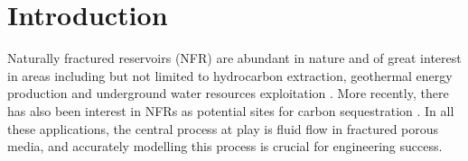 \documentclass[draft]{agujournal2018}
\begin{document}
%
%

%


%
%
%
%


\section{Introduction}
Naturally fractured reservoirs (NFR) are abundant in nature and of great interest in areas including but not limited to hydrocarbon extraction, geothermal energy production and underground water resources exploitation \citep{Berkowitz2002}. More recently, there has also been 
interest in NFRs as potential sites for carbon sequestration \citep{March2018}. In all these applications, the central process at play is fluid flow in fractured porous media, and accurately modelling this process is crucial for engineering success.
\end{document}
